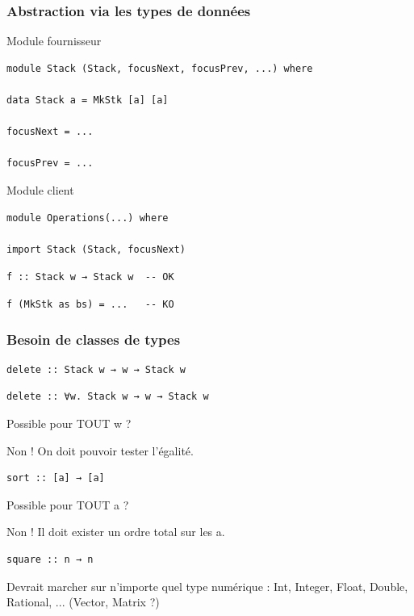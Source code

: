 \documentclass[10pt]{beamer}
\begin{document}
\begin{frame}[fragile]
\frametitle{Abstraction via les types de données}
\begin{block}
{Module fournisseur}
\begin{verbatim}
module Stack (Stack, focusNext, focusPrev, ...) where

data Stack a = MkStk [a] [a]

focusNext = ...

focusPrev = ...
\end{verbatim}
\end{block}
\pause
\begin{block}
{Module client}
\begin{verbatim}
module Operations(...) where

import Stack (Stack, focusNext)
\end{verbatim}
\pause

\verb|f :: Stack w → Stack w  -- OK|

\pause

\verb|f (MkStk as bs) = ...   -- KO|

\end{block}
\end{frame}



\begin{frame}[fragile]
\frametitle{Besoin de classes de types}
\begin{verbatim}
delete :: Stack w → w → Stack w
\end{verbatim}

\pause

\begin{verbatim}
delete :: ∀w. Stack w → w → Stack w
\end{verbatim}

Possible pour TOUT w ?

\pause

Non ! On doit pouvoir tester l'égalité.

\pause

\begin{verbatim}
sort :: [a] → [a]
\end{verbatim}

Possible pour TOUT a ?

\pause

Non ! Il doit exister un ordre total sur les a.

\pause

\begin{verbatim}
square :: n → n
\end{verbatim}

Devrait marcher sur n'importe quel type numérique : Int, Integer, Float,
Double, Rational, ... (Vector, Matrix ?)

\end{frame}
\end{document}
